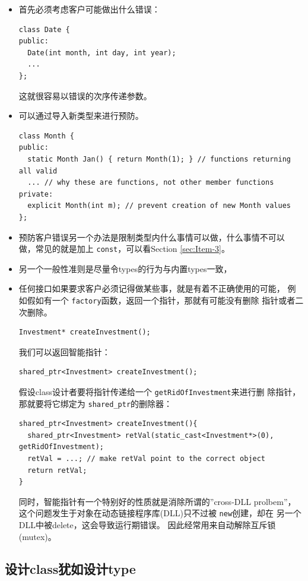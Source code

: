 \documentclass[a4paper,twoside]{article}
\theoremstyle{definition}
\theoremstyle{remark}
\numberwithin{equation}{section}
\let\OldTexttt\texttt
\renewcommand{\texttt}[1]{{\color{blue} \OldTexttt{#1}}}
\begin{document}
\begin{itemize}
\item 首先必须考虑客户可能做出什么错误：
\begin{verbatim}
class Date {
public:
  Date(int month, int day, int year);
  ...
};
\end{verbatim}
这就很容易以错误的次序传递参数。
\item 可以通过导入新类型来进行预防。
\begin{verbatim}
class Month {
public:
  static Month Jan() { return Month(1); } // functions returning all valid
  ... // why these are functions, not other member functions
private:
  explicit Month(int m); // prevent creation of new Month values
};
\end{verbatim}
  
\item 预防客户错误另一个办法是限制类型内什么事情可以做，什么事情不可以
  做，常见的就是加上\texttt{const}，可以看Section \ref{sec:Item-3}。
\item 另一个一般性准则是尽量令types的行为与内置types一致，
\item 任何接口如果要求客户必须记得做某些事，就是有着不正确使用的可能，
  例如假如有一个\texttt{factory}函数，返回一个指针，那就有可能没有删除
  指针或者二次删除。
\begin{verbatim}
Investment* createInvestment(); 
\end{verbatim}
  我们可以返回智能指针：
\begin{verbatim}
shared_ptr<Investment> createInvestment();
\end{verbatim}
  假设class设计者要将指针传递给一个\texttt{getRidOfInvestment}来进行删
  除指针，那就要将它绑定为\texttt{shared\_ptr}的删除器：
\begin{verbatim}
shared_ptr<Investment> createInvestment(){
  shared_ptr<Investment> retVal(static_cast<Investment*>(0),
getRidOfInvestment);
  retVal = ...; // make retVal point to the correct object
  return retVal;
}
\end{verbatim}
同时，智能指针有一个特别好的性质就是消除所谓的''cross-DLL prolbem''，
这个问题发生于对象在动态链接程序库(DLL)只不过被\texttt{new}创建，却在
另一个DLL中被delete，这会导致运行期错误。 因此经常用来自动解除互斥锁
(mutex)。
\end{itemize}

\subsection{设计class犹如设计type}
\label{sec:Item-19}
\end{document}
